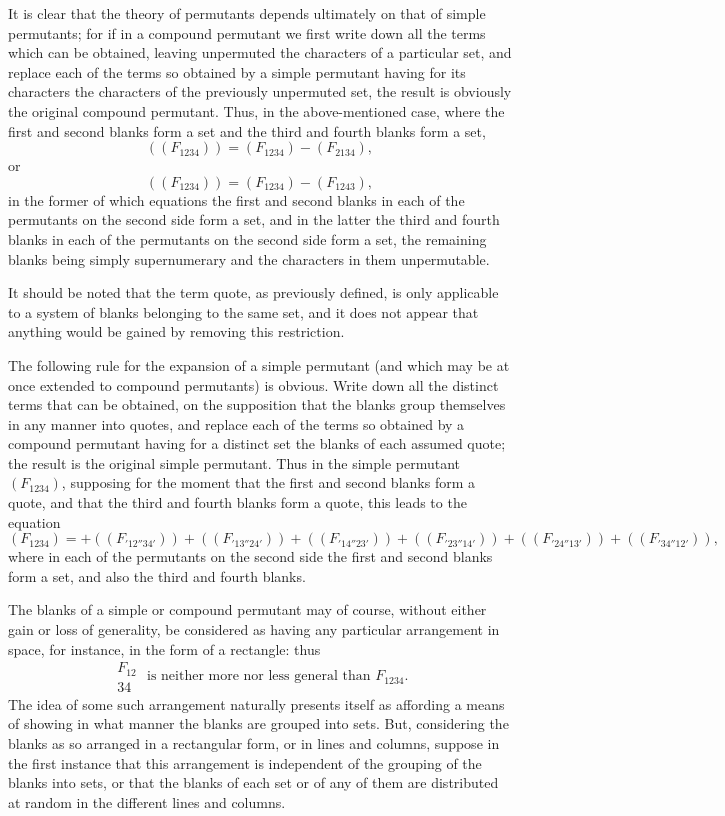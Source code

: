 \documentclass[11pt,a4paper]{book}
\begin{document}
It is clear that the theory of permutants depends ultimately on that of simple permutants; for if in a compound permutant we first write down all the terms which can be obtained, leaving unpermuted the characters of a particular set, and replace each of the terms so obtained by a simple permutant having for its characters the characters of the previously unpermuted set, the result is obviously the original compound permutant. Thus, in the above-mentioned case, where the first and second blanks form a set and the third and fourth blanks form a set,
\[((F_{1234})) = (F_{1234}) - (F_{2134}),\]
or
\[((F_{1234})) = (F_{1234}) - (F_{1243}),\]
in the former of which equations the first and second blanks in each of the permutants on the second side form a set, and in the latter the third and fourth blanks in each of the permutants on the second side form a set, the remaining blanks being simply supernumerary and the characters in them unpermutable.

It should be noted that the term quote, as previously defined, is only applicable to a system of blanks belonging to the same set, and it does not appear that anything would be gained by removing this restriction.

The following rule for the expansion of a simple permutant (and which may be at once extended to compound permutants) is obvious. Write down all the distinct terms that can be obtained, on the supposition that the blanks group themselves in any manner into quotes, and replace each of the terms so obtained by a compound permutant having for a distinct set the blanks of each assumed quote; the result is the original simple permutant. Thus in the simple permutant $(F_{1234})$, supposing for the moment that the first and second blanks form a quote, and that the third and fourth blanks form a quote, this leads to the equation
\[(F_{1234}) = +((F_{'12''34'})) + ((F_{'13''24'})) + ((F_{'14''23'})) + ((F_{'23''14'})) + ((F_{'24''13'})) + ((F_{'34''12'})),\]
where in each of the permutants on the second side the first and second blanks form a set, and also the third and fourth blanks.

The blanks of a simple or compound permutant may of course, without either gain or loss of generality, be considered as having any particular arrangement in space, for instance, in the form of a rectangle: thus
\[\begin{matrix} F_{12} \\ 34 \end{matrix} \text{ is neither more nor less general than } F_{1234}.\]
The idea of some such arrangement naturally presents itself as affording a means of showing in what manner the blanks are grouped into sets. But, considering the blanks as so arranged in a rectangular form, or in lines and columns, suppose in the first instance that this arrangement is independent of the grouping of the blanks into sets, or that the blanks of each set or of any of them are distributed at random in the different lines and columns.
\end{document}
